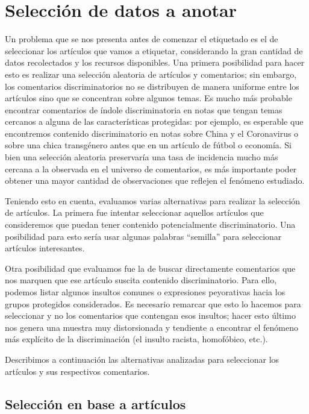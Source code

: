 \section{Selección de datos a anotar}


Un problema que se nos presenta antes de comenzar el etiquetado es el de seleccionar los artículos que vamos a etiquetar, considerando la gran cantidad de datos recolectados y los recursos disponibles. Una primera posibilidad para hacer esto es realizar una selección aleatoria de artículos y comentarios; sin embargo, los comentarios discriminatorios no se distribuyen de manera uniforme entre los artículos sino que se concentran sobre algunos temas. Es mucho más probable encontrar comentarios de índole discriminatoria en notas que tengan temas cercanos a alguna de las características protegidas: por ejemplo, es esperable que encontremos contenido discriminatorio en notas sobre China y el Coronavirus o sobre una chica transgénero antes que en un artículo de fútbol o economía. Si bien una selección aleatoria preservaría una tasa de incidencia mucho más cercana a la observada en el universo de comentarios, es más importante poder obtener una mayor cantidad de observaciones que reflejen el fenómeno estudiado.

Teniendo esto en cuenta, evaluamos varias alternativas para realizar la selección de artículos. La primera fue intentar seleccionar aquellos artículos que consideremos que puedan tener contenido potencialmente discriminatorio. Una posibilidad para esto sería usar algunas palabras ``semilla'' para seleccionar artículos interesantes.

Otra posibilidad que evaluamos fue la de buscar directamente comentarios que nos marquen que ese artículo suscita contenido discriminatorio. Para ello, podemos listar algunos insultos comunes o expresiones peyorativas hacia los grupos protegidos considerados. Es necesario remarcar que esto lo hacemos para seleccionar  y no los comentarios que contengan esos insultos; hacer esto último nos genera una muestra muy distorsionada y tendiente a encontrar el fenómeno más explícito de la discriminación (el insulto racista, homofóbico, etc.).

Describimos a continuación las alternativas analizadas para seleccionar los artículos y sus respectivos comentarios.


\subsection{Selección en base a artículos}

